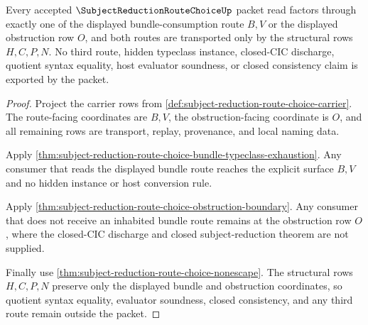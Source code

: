 \begin{theorem}
\label{thm:subject-reduction-route-choice-obstruction-route-exhaustion}
Every accepted $\SubjectReductionRouteChoiceUp$ packet read factors through exactly one of the displayed bundle-consumption route $B,V$ or the displayed obstruction row $O$, and both routes are transported only by the structural rows $H,C,P,N$. No third route, hidden typeclass instance, closed-CIC discharge, quotient syntax equality, host evaluator soundness, or closed consistency claim is exported by the packet.
\end{theorem}
\begin{proof}
Project the carrier rows from \autoref{def:subject-reduction-route-choice-carrier}. The route-facing coordinates are $B,V$, the obstruction-facing coordinate is $O$, and all remaining rows are transport, replay, provenance, and local naming data.

Apply \autoref{thm:subject-reduction-route-choice-bundle-typeclass-exhaustion}. Any consumer that reads the displayed bundle route reaches the explicit surface $B,V$ and no hidden instance or host conversion rule.

Apply \autoref{thm:subject-reduction-route-choice-obstruction-boundary}. Any consumer that does not receive an inhabited bundle route remains at the obstruction row $O$, where the closed-CIC discharge and closed subject-reduction theorem are not supplied.

Finally use \autoref{thm:subject-reduction-route-choice-nonescape}. The structural rows $H,C,P,N$ preserve only the displayed bundle and obstruction coordinates, so quotient syntax equality, evaluator soundness, closed consistency, and any third route remain outside the packet.
\end{proof}

